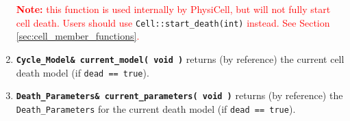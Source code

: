 \documentclass[12pt]{article}
\renewcommand{\v}{\verb}
\newcommand{\smallcode}[1]{\textbf{\texttt{#1}}}
\newcommand{\red}[1]{\textcolor{red}{#1}}
\newcommand{\blue}[1]{\textcolor{blue}{#1}}
\newcommand{\DONE}{}%
\begin{document}
\begin{enumerate}
\red{\textbf{Note:} this function is used internally by PhysiCell, but will not fully start cell death. 
Users should use } \v|Cell::start_death(int)| \red{ instead. See Section \ref{sec:cell_member_functions}.} 

\item 
\smallcode{Cycle\_Model\& current\_model( void )} returns (by reference) the current cell death model 
(if \hfill\break\v|dead == true|). 

\item 
\smallcode{Death\_Parameters\& current\_parameters( void )} returns (by reference) the \\ \v|Death_Parameters| 
for the current death model (if \v|dead == true|). 
\end{enumerate}


     
     
     
     
\end{document}
